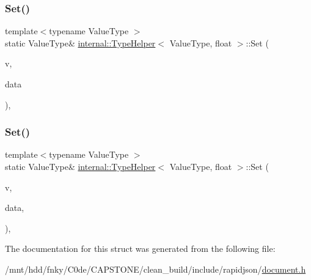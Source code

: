\mbox{\label{structinternal_1_1TypeHelper_3_01ValueType_00_01float_01_4_a28318c2063421cf18dfa23d16352a3b8}} 
\subsubsection{\texorpdfstring{Set()}{Set()}\hspace{0.1cm}{\footnotesize\ttfamily [1/2]}}
{\footnotesize\ttfamily template$<$typename Value\+Type $>$ \\
static Value\+Type\& \hyperlink{structinternal_1_1TypeHelper}{internal\+::\+Type\+Helper}$<$ Value\+Type, float $>$\+::Set (\begin{DoxyParamCaption}\item[{Value\+Type \&}]{v,  }\item[{float}]{data }\end{DoxyParamCaption})\hspace{0.3cm}{\ttfamily [inline]}, {\ttfamily [static]}}

\mbox{\label{structinternal_1_1TypeHelper_3_01ValueType_00_01float_01_4_a3a0d8783f6228504058c427a16687bdf}} 
\subsubsection{\texorpdfstring{Set()}{Set()}\hspace{0.1cm}{\footnotesize\ttfamily [2/2]}}
{\footnotesize\ttfamily template$<$typename Value\+Type $>$ \\
static Value\+Type\& \hyperlink{structinternal_1_1TypeHelper}{internal\+::\+Type\+Helper}$<$ Value\+Type, float $>$\+::Set (\begin{DoxyParamCaption}\item[{Value\+Type \&}]{v,  }\item[{float}]{data,  }\item[{typename Value\+Type\+::\+Allocator\+Type \&}]{ }\end{DoxyParamCaption})\hspace{0.3cm}{\ttfamily [inline]}, {\ttfamily [static]}}



The documentation for this struct was generated from the following file\+:\begin{DoxyCompactItemize}
\item 
/mnt/hdd/fnky/\+C0de/\+C\+A\+P\+S\+T\+O\+N\+E/clean\+\_\+build/include/rapidjson/\hyperlink{document_8h}{document.\+h}\end{DoxyCompactItemize}
